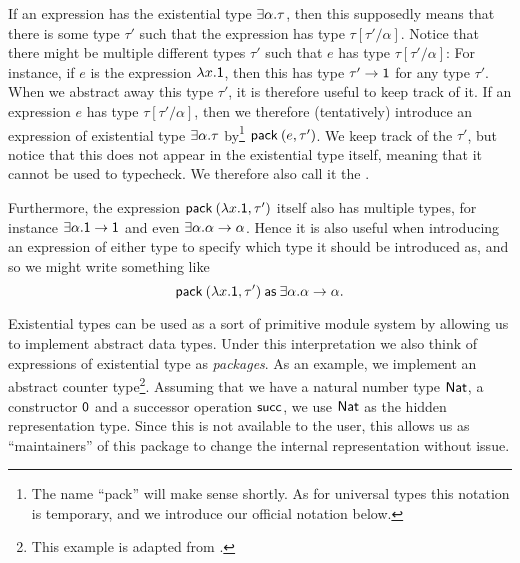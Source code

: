 If an expression has the existential type $\typeExists{\alpha}{\tau}$, then this supposedly means that there is some type $\tau'$ such that the expression has type $\tau[\tau'/\alpha]$. Notice that there might be multiple different types $\tau'$ such that $e$ has type $\tau[\tau'/\alpha]$: For instance, if $e$ is the expression $\expLam{x}{\expUnit}$, then this has type $\typeFunc{\tau'}{\typeUnit}$ for any type $\tau'$. When we abstract away this type $\tau'$, it is therefore useful to keep track of it. If an expression $e$ has type $\tau[\tau'/\alpha]$, then we therefore (tentatively) introduce an expression of existential type $\typeExists{\alpha}{\tau}$ by\footnote{The name \enquote{pack} will make sense shortly. As for universal types this notation is temporary, and we introduce our official notation below.} $\expPack{(e,\tau')}$. We keep track of the  $\tau'$, but notice that this does not appear in the existential type itself, meaning that it cannot be used to typecheck. We therefore also call it the .

Furthermore, the expression $\expPack{(\expLam{x}{\expUnit},\tau')}$ itself also has multiple types, for instance $\typeExists{\alpha}{\typeFunc{\typeUnit}{\typeUnit}}$ and even $\typeExists{\alpha}{\typeFunc{\alpha}{\alpha}}$. Hence it is also useful when introducing an expression of either type to specify which type it should be introduced as, and so we might write something like
%
\begin{equation*}
    \expPackAs{\expLam{x}{\expUnit}}{\tau'}{\alpha}{\typeFunc{\alpha}{\alpha}}. %
\end{equation*}

Existential types can be used as a sort of primitive module system by allowing us to implement abstract data types. Under this interpretation we also think of expressions of existential type as \emph{packages}. As an example, we implement an abstract counter type\footnote{This example is adapted from \textcite[§24.2]{pierce-types}.}. Assuming that we have a natural number type $\mathsf{Nat}$, a constructor $\mathsf{0}$ and a successor operation $\mathsf{succ}$, we use $\mathsf{Nat}$ as the hidden representation type. Since this is not available to the user, this allows us as \enquote{maintainers} of this package to change the internal representation without issue.

